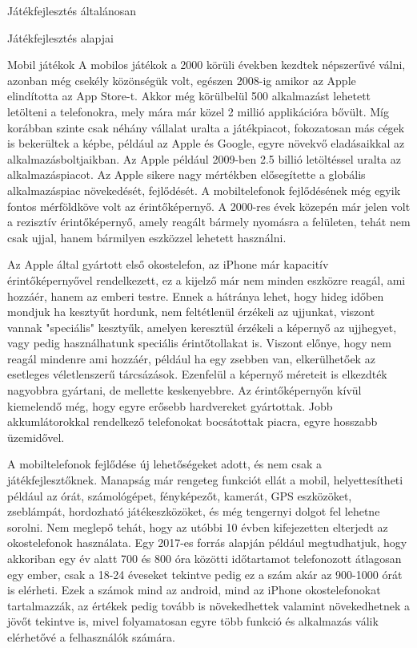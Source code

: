 \begin{MyChapter}{Játékfejlesztés általánosan}
\begin{MySection}{Játékfejlesztés alapjai}
		\begin{MySubSection}{Mobil játékok}
		A mobilos játékok a 2000 körüli években kezdtek népszerűvé válni, azonban még csekély közönségük volt, egészen 2008-ig amikor az Apple elindította az App Store-t. Akkor még körülbelül 500 alkalmazást lehetett letölteni a telefonokra, mely mára már közel 2 millió applikációra bővült. Míg korábban szinte csak néhány vállalat uralta a játékpiacot, fokozatosan más cégek is bekerültek a képbe, például az Apple és Google, egyre növekvő eladásaikkal az alkalmazásboltjaikban. Az Apple például 2009-ben 2.5 billió letöltéssel uralta az alkalmazáspiacot. Az Apple sikere nagy mértékben elősegítette a globális alkalmazáspiac növekedését, fejlődését.
		A mobiltelefonok fejlődésének még egyik fontos mérföldköve volt az érintőképernyő. A 2000-res évek közepén már jelen volt a rezisztív érintőképernyő, amely reagált bármely nyomásra a felületen, tehát nem csak ujjal, hanem bármilyen eszközzel lehetett használni.
		
		Az Apple által gyártott első okostelefon, az iPhone már kapacitív érintőképernyővel rendelkezett, ez a kijelző már nem minden eszközre reagál, ami hozzáér, hanem az emberi testre. Ennek a hátránya lehet, hogy hideg időben mondjuk ha kesztyűt hordunk, nem feltétlenül érzékeli az ujjunkat, viszont vannak "speciális" kesztyűk, amelyen keresztül érzékeli a képernyő az ujjhegyet, vagy pedig használhatunk speciális érintőtollakat is. 
		Viszont előnye, hogy nem reagál mindenre ami hozzáér, például ha egy zsebben van, elkerülhetőek az esetleges véletlenszerű tárcsázások.
		Ezenfelül a képernyő méreteit is elkezdték nagyobbra gyártani, de mellette keskenyebbre. Az érintőképernyőn kívül kiemelendő még, hogy egyre erősebb hardvereket gyártottak. Jobb akkumlátorokkal rendelkező telefonokat bocsátottak piacra, egyre hosszabb üzemidővel.
		
		A mobiltelefonok fejlődése új lehetőségeket adott, és nem csak a játékfejlesztőknek. Manapság már rengeteg funkciót ellát a mobil, helyettesítheti például az órát, számológépet, fényképezőt, kamerát, GPS eszközöket, zseblámpát, hordozható játékeszközöket, és még tengernyi dolgot fel lehetne sorolni. Nem meglepő tehát, hogy az utóbbi 10 évben kifejezetten elterjedt az okostelefonok használata. 
		Egy 2017-es forrás alapján például megtudhatjuk, hogy akkoriban egy év alatt 700 és 800 óra közötti időtartamot telefonozott átlagosan egy ember, csak a 18-24 éveseket tekintve pedig ez a szám akár az 900-1000 órát is elérheti. Ezek a számok mind az android, mind az iPhone okostelefonokat tartalmazzák, az értékek pedig tovább is növekedhettek valamint növekedhetnek a jövőt tekintve is, mivel folyamatosan egyre több funkció és alkalmazás válik elérhetővé a felhasználók számára.
		

\end{MySubSection}
\end{MySection}
\end{MyChapter}
